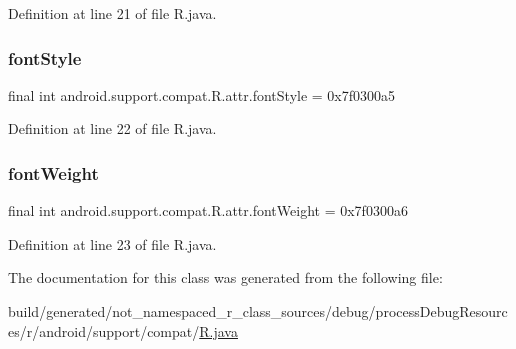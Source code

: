 Definition at line 21 of file R.\+java.

\mbox{\label{classandroid_1_1support_1_1compat_1_1_r_1_1attr_aafb47e665f110a6e8fd90833aefd0e1f}} 
\subsubsection{\texorpdfstring{fontStyle}{fontStyle}}
{\footnotesize\ttfamily final int android.\+support.\+compat.\+R.\+attr.\+font\+Style = 0x7f0300a5\hspace{0.3cm}{\ttfamily [static]}}



Definition at line 22 of file R.\+java.

\mbox{\label{classandroid_1_1support_1_1compat_1_1_r_1_1attr_ab95e33bc7552ac24227086aae1de1973}} 
\subsubsection{\texorpdfstring{fontWeight}{fontWeight}}
{\footnotesize\ttfamily final int android.\+support.\+compat.\+R.\+attr.\+font\+Weight = 0x7f0300a6\hspace{0.3cm}{\ttfamily [static]}}



Definition at line 23 of file R.\+java.



The documentation for this class was generated from the following file\+:\begin{DoxyCompactItemize}
\item 
build/generated/not\+\_\+namespaced\+\_\+r\+\_\+class\+\_\+sources/debug/process\+Debug\+Resources/r/android/support/compat/\mbox{\hyperlink{android_2support_2compat_2_r_8java}{R.\+java}}\end{DoxyCompactItemize}
